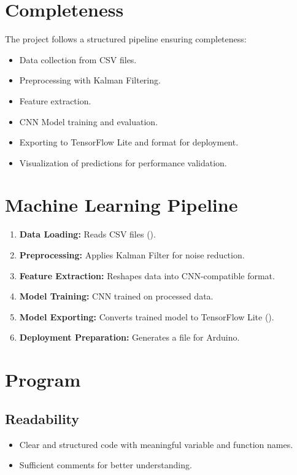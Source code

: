 \section{Completeness}
The project follows a structured pipeline ensuring completeness:
\begin{itemize}
	\item Data collection from CSV files.
	\item Preprocessing with Kalman Filtering.
	\item Feature extraction.
	\item CNN Model training and evaluation.
	\item Exporting to TensorFlow Lite and  format for deployment.
	\item Visualization of predictions for performance validation.
\end{itemize}

\section{Machine Learning Pipeline}
\begin{enumerate}
	\item \textbf{Data Loading:} Reads CSV files ().
	\item \textbf{Preprocessing:} Applies Kalman Filter for noise reduction. \cite{Welch:1995}
	\item \textbf{Feature Extraction:} Reshapes data into CNN-compatible format.
	\item \textbf{Model Training:} CNN trained on processed data.
	\item \textbf{Model Exporting:} Converts trained model to TensorFlow Lite ().
	\item \textbf{Deployment Preparation:} Generates a  file for Arduino.
\end{enumerate}

\section{Program}

\subsection{Readability}
\begin{itemize}
	\item Clear and structured code with meaningful variable and function names.
	\item Sufficient comments for better understanding.
\end{itemize}

